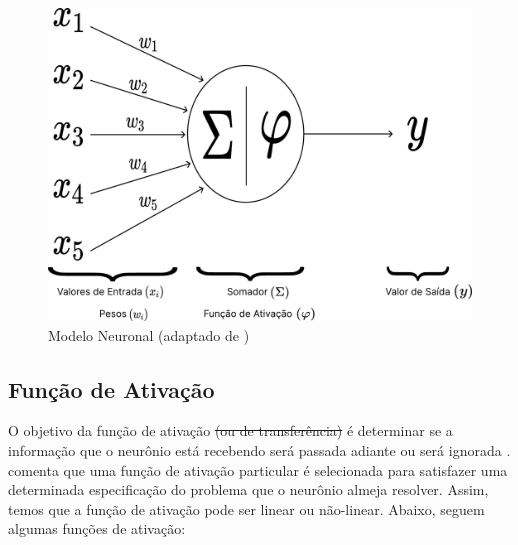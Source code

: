 \documentclass{automatextcc}
\begin{document}
\begin{figure}
    \centering
    \includegraphics[width=.7\textwidth]{figuras/neuron_model.pdf}
	\caption{Modelo Neuronal (adaptado de \citet{haykin2001,hair2005})}
\end{figure}

\subsection{Função de Ativação}
O objetivo da função de ativação \sout{(ou de transferência)} é determinar se a informação que o neurônio está recebendo será passada adiante ou será ignorada \citep{dsa2022} . \citet{hagan2014} comenta que uma função de ativação particular é selecionada para satisfazer uma determinada especificação do problema que o neurônio almeja resolver. Assim, temos que a função de ativação pode ser linear ou não-linear. Abaixo, seguem algumas funções de ativação:
\end{document}
